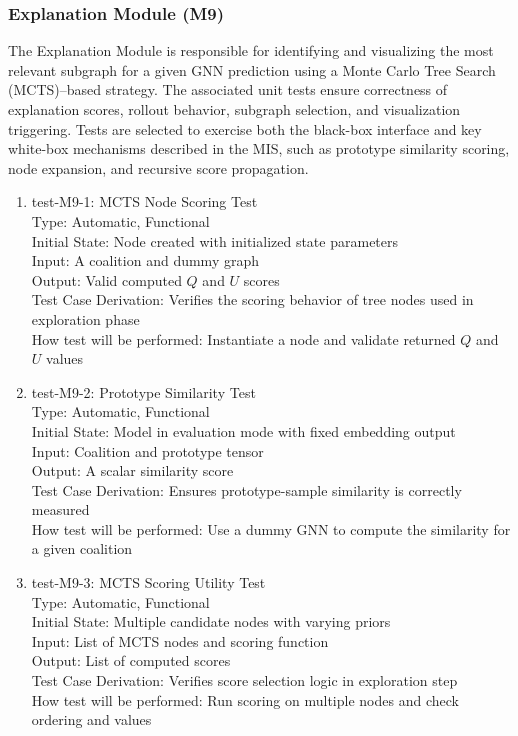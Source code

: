 \documentclass[12pt, titlepage]{article}
\begin{document}
\subsubsection{Explanation Module (M9)}

The Explanation Module is responsible for identifying and visualizing the most relevant subgraph for a given GNN prediction using a Monte Carlo Tree Search (MCTS)–based strategy. The associated unit tests ensure correctness of explanation scores, rollout behavior, subgraph selection, and visualization triggering. Tests are selected to exercise both the black-box interface and key white-box mechanisms described in the MIS, such as prototype similarity scoring, node expansion, and recursive score propagation.

\begin{enumerate}

\item{test-M9-1: MCTS Node Scoring Test\\}
Type: Automatic, Functional \\
Initial State: Node created with initialized state parameters \\
Input: A coalition and dummy graph \\
Output: Valid computed $Q$ and $U$ scores \\
Test Case Derivation: Verifies the scoring behavior of tree nodes used in exploration phase \\
How test will be performed: Instantiate a node and validate returned $Q$ and $U$ values

\item{test-M9-2: Prototype Similarity Test\\}
Type: Automatic, Functional \\
Initial State: Model in evaluation mode with fixed embedding output \\
Input: Coalition and prototype tensor \\
Output: A scalar similarity score \\
Test Case Derivation: Ensures prototype-sample similarity is correctly measured \\
How test will be performed: Use a dummy GNN to compute the similarity for a given coalition

\item{test-M9-3: MCTS Scoring Utility Test\\}
Type: Automatic, Functional \\
Initial State: Multiple candidate nodes with varying priors \\
Input: List of MCTS nodes and scoring function \\
Output: List of computed scores \\
Test Case Derivation: Verifies score selection logic in exploration step \\
How test will be performed: Run scoring on multiple nodes and check ordering and values


\end{enumerate}
\end{document}

